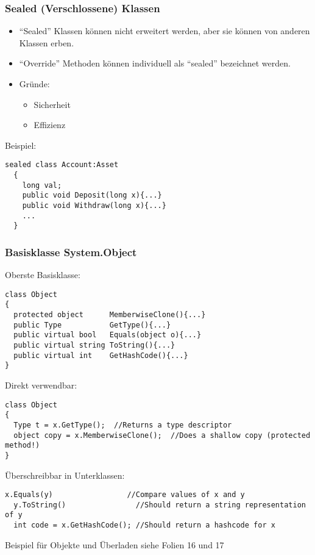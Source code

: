 \newpage
\subsubsection{Sealed (Verschlossene) Klassen}
\begin{itemize}
  \item "`Sealed"' Klassen können nicht erweitert werden, aber sie können von
  anderen Klassen erben. 
  \item "`Override"' Methoden können individuell als "`sealed"' bezeichnet
  werden.
  \item Gründe:
  \begin{itemize}
    \item Sicherheit
    \item Effizienz
  \end{itemize}
\end{itemize}
Beispiel: 
\begin{lstlisting}[style=Csharp]
  sealed class Account:Asset
  {
    long val; 
    public void Deposit(long x){...}
    public void Withdraw(long x){...}
    ...
  }
\end{lstlisting}

\subsubsection{Basisklasse System.Object}
Oberste Basisklasse:
\begin{lstlisting}[style=Csharp]
class Object
{
  protected object      MemberwiseClone(){...}
  public Type           GetType(){...}
  public virtual bool   Equals(object o){...}
  public virtual string ToString(){...}
  public virtual int    GetHashCode(){...}
}
\end{lstlisting}
Direkt verwendbar: 
\begin{lstlisting}[style=Csharp]
class Object
{
  Type t = x.GetType();  //Returns a type descriptor
  object copy = x.MemberwiseClone();  //Does a shallow copy (protected method!)
}
\end{lstlisting}
Überschreibbar in Unterklassen: 
\begin{lstlisting}[style=Csharp]
  x.Equals(y)                 //Compare values of x and y
  y.ToString()                //Should return a string representation of y
  int code = x.GetHashCode(); //Should return a hashcode for x
\end{lstlisting}

Beispiel für Objekte und Überladen siehe Folien 16 und 17
